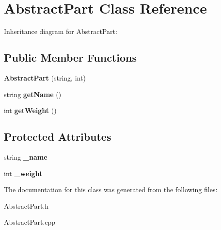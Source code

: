 \hypertarget{classAbstractPart}{}\section{Abstract\+Part Class Reference}
\label{classAbstractPart}


Inheritance diagram for Abstract\+Part\+:
\subsection*{Public Member Functions}
\begin{DoxyCompactItemize}
\item 
\mbox{\label{classAbstractPart_abb9125372c5fcf358a21ef77e699465a}} 
{\bfseries Abstract\+Part} (string, int)
\item 
\mbox{\label{classAbstractPart_a2c0b664ee289398f1cee4ccc9fd338ab}} 
string {\bfseries get\+Name} ()
\item 
\mbox{\label{classAbstractPart_aab2ba166c4bec8b75b81745ae1f53e82}} 
int {\bfseries get\+Weight} ()
\end{DoxyCompactItemize}
\subsection*{Protected Attributes}
\begin{DoxyCompactItemize}
\item 
\mbox{\label{classAbstractPart_a2558789894a281c83e66f3e36cb15782}} 
string {\bfseries \+\_\+name}
\item 
\mbox{\label{classAbstractPart_a4da5631ed0fc448afed1b51a8f622018}} 
int {\bfseries \+\_\+weight}
\end{DoxyCompactItemize}


The documentation for this class was generated from the following files\+:\begin{DoxyCompactItemize}
\item 
Abstract\+Part.\+h\item 
Abstract\+Part.\+cpp\end{DoxyCompactItemize}
